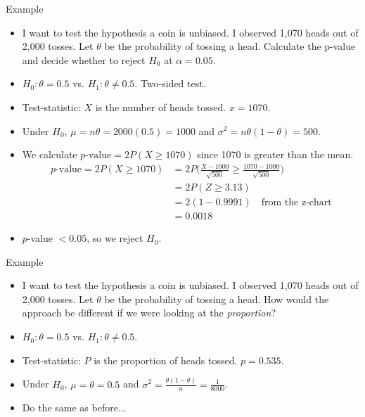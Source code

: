 \documentclass[10pt, handout, xcolor=table]{beamer}
\begin{document}
\begin{frame}{Example}
\begin{itemize}
\setlength{\itemsep}{5pt}
\item I want to test the hypothesis a coin is unbiased. I observed 1,070 heads out of 2,000 tosses. Let $\theta$ be the probability of tossing a head. Calculate the p-value and decide whether to reject $H_0$ at $\alpha = 0.05$.
\item<2->[Ans:] \color{red} $H_0: \theta = 0.5$ vs. $H_1: \theta \neq 0.5$. Two-sided test.
\item<2->[] \color{red} Test-statistic: $X$ is the number of heads tossed. $x = 1070$.
\item<2->[] \color{red} Under $H_0$, $\mu = n\theta = 2000(0.5) = 1000$ and $\sigma^2 = n\theta(1-\theta) = 500$.
\item<2->[] \color{red} We calculate $p\text{-value} = 2P(X \geq 1070)$ since 1070 is greater than the mean.
\vspace*{-1ex}
\begin{align*}
p\text{-value} = 2P(X \geq 1070) &= 2P\bigg(\frac{X-1000}{\sqrt{500}} \geq \frac{1070-1000}{\sqrt{500}}\bigg)\\
&= 2P(Z \geq 3.13)\\
&= 2(1-0.9991) \quad \text{from the z-chart}\\
&= 0.0018
\end{align*}
\vspace*{-5ex}
\item<2->[] \color{red} $p$-value $< 0.05$, so we reject $H_0$.
\end{itemize}
\end{frame}

\begin{frame}{Example}
\begin{itemize}
\setlength{\itemsep}{10pt}
\item I want to test the hypothesis a coin is unbiased. I observed 1,070 heads out of 2,000 tosses. Let $\theta$ be the probability of tossing a head. How would the approach be different if we were looking at the \textit{proportion}?
\item<2->[Ans:] \color{red} $H_0: \theta = 0.5$ vs. $H_1: \theta \neq 0.5$.
\item<2->[] \color{red} Test-statistic: $P$ is the proportion of heads tossed. $p = 0.535$.
\item<2->[] \color{red} Under $H_0$, $\mu = \theta = 0.5$ and $\sigma^2 = \frac{\theta(1-\theta)}{n} = \frac{1}{8000}$.
\item<2->[] \color{red} Do the same as before...
\end{itemize}
\end{frame}
\end{document}
